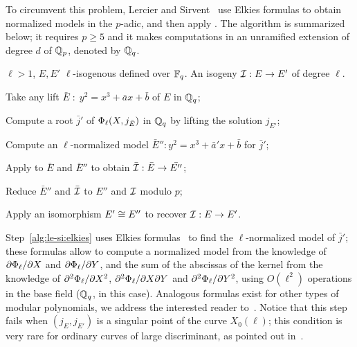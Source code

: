 To circumvent this problem, Lercier and
Sirvent~\cite{lercier+sirvent08} use Elkies formulas to obtain
normalized models in the $p$-adic, and then apply
\hyperref[alg:bmss]{}. The algorithm is summarized below; it
requires $p\ge5$ and it makes computations in an unramified extension
of degree $d$ of $\mathbb{Q}_p$, denoted by $\mathbb{Q}_q$.

\begin{algorithm*}
  \caption{\label{alg:le-si}}
  \begin{algorithmic}[1]
    \REQUIRE $\ell>1$, $E,E'$ $\ell$-isogenous defined over $\mathbb{F}_q$.
    \ENSURE An isogeny $\mathcal{I}:E\rightarrow E'$ of degree $\ell$.

    \STATE \label{alg:le-si:lift1}Take any lift
    $\bar{E}\;:\;y^2=x^3+\bar{a}x+\bar{b}$ of $E$ in $\mathbb{Q}_q$;
    
    \STATE \label{alg:le-si:modpol}Compute a root $\bar{j}'$ of
    $\Phi_\ell(X,j_{\bar{E}})$ in $\mathbb{Q}_q$ by lifting the solution
    $j_{E'}$;
    
    \STATE \label{alg:le-si:elkies} Compute an $\ell$-normalized model
    $\bar{E}'':y^2=x^3+\bar{a}'x+\bar{b}$ for $\bar{j}'$;
    
    \STATE \label{alg:le-si:bmss}Apply \hyperref[alg:bmss]{} to $\bar{E}$ and
    $\bar{E}''$ to obtain $\bar{\mathcal{I}}:\bar{E}\rightarrow\bar{E''}$;
    
    \STATE \label{alg:le-si:reduce}Reduce $\bar{E}''$ and $\bar{\mathcal{I}}$
    to $E''$ and $\mathcal{I}$ modulo $p$;
    
    \STATE \label{alg:le-si:isom}Apply an isomorphism $E'\cong E''$ to
    recover $\mathcal{I}:E\rightarrow E'$.
  \end{algorithmic}
\end{algorithm*}

Step~\ref{alg:le-si:elkies} uses Elkies formulas~\cite{elkies98} to
find the $\ell$-normalized model of $\bar{j}'$; these formulas allow
to compute a normalized model from the knowledge of
$\partial\Phi_\ell/\partial X$ and $\partial\Phi_\ell/\partial
Y$, and the sum of the abscissas of the kernel from the knowledge of
$\partial^2\Phi_\ell/\partial X^2$,
$\partial^2\Phi_\ell/\partial X\partial Y$ and
$\partial^2\Phi_\ell/\partial Y^2$, using $O(\ell^2)$
operations in the base field ($\mathbb{Q}_q$, in this case). Analogous
formulas exist for other types of modular polynomials, we address the
interested reader
to~\cite{schoof95,morain95,elkies98,lercier-algorithmique}. Notice
that this step fails when $(j_E,j_{E'})$ is a singular point of the
curve $X_0(\ell)$; this condition is very rare for ordinary curves of
large discriminant, as pointed out in~\cite[$\S7$]{schoof95}.

